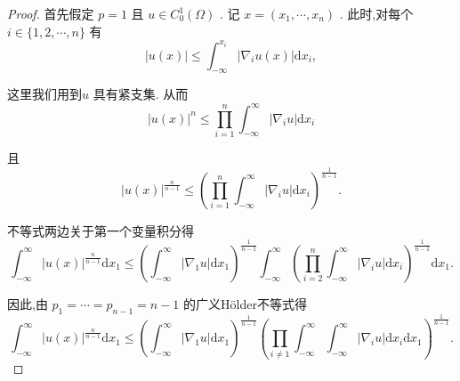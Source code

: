 \documentclass[lang=cn,newtx,10pt,scheme=chinese,thmcnt=chapter]{elegantbook}
\newcommand{\dif}{\mathrm{d}}
\begin{document}
\begin{proof}
  首先假定 \(p = 1\) 且 \(u \in  {C}_{0}^{1}\left( \Omega \right)\) . 记 \(x = \left( {{x}_{1},\cdots ,{x}_{n}}\right)\) . 此时,对每个 \(i \in  \{ 1,2,\cdots ,n\}\) 有
\begin{equation*}
\left| {u\left( x\right) }\right|  \leqslant  {\int }_{-\infty }^{{x}_{i}}\left| {{\nabla }_{i}u\left( x\right) }\right| \dif x_i,
\end{equation*}

这里我们用到\(u\) 具有紧支集. 从而
\begin{equation*}
{\left| u\left( x\right) \right| }^{n} \leqslant  \mathop{\prod }\limits_{{i = 1}}^{n}{\int }_{-\infty }^{\infty }\left| {{\nabla }_{i}u}\right| \dif x_i
\end{equation*}

且
\begin{equation*}
{\left| u\left( x\right) \right| }^{\frac{n}{n - 1}} \leqslant  {\left( \mathop{\prod }\limits_{{i = 1}}^{n}{\int }_{-\infty }^{\infty }\left| {\nabla }_{i}u\right| \dif x_i\right) }^{\frac{1}{n - 1}}.
\end{equation*}

不等式两边关于第一个变量积分得
\begin{equation*}
{\int }_{-\infty }^{\infty }{\left| u\left( x\right) \right| }^{\frac{n}{n - 1}}\dif x_1 \leqslant  {\left( {\int }_{-\infty }^{\infty }\left| {\nabla }_{1}u\right| \dif x_1\right) }^{\frac{1}{n - 1}}{\int }_{-\infty }^{\infty }{\left( \mathop{\prod }\limits_{{i = 2}}^{n}{\int }_{-\infty }^{\infty }\left| {\nabla }_{i}u\right| \dif x_i\right) }^{\frac{1}{n - 1}}\dif x_1.
\end{equation*}

因此,由 \({p}_{1} = \cdots  = {p}_{n - 1} = n - 1\) 的广义Hölder不等式得
\begin{equation*}
{\int }_{-\infty }^{\infty }{\left| u\left( x\right) \right| }^{\frac{n}{n - 1}}\dif x_1 \leqslant  {\left( {\int }_{-\infty }^{\infty }\left| {\nabla }_{1}u\right| \dif x_1\right) }^{\frac{1}{n - 1}}{\left( \mathop{\prod }\limits_{{i \neq  1}}{\int }_{-\infty }^{\infty }{\int }_{-\infty }^{\infty }\left| {\nabla }_{i}u\right| \dif x_i\dif x_1\right) }^{\frac{1}{n - 1}}.
\end{equation*}


\end{proof}
\end{document}
